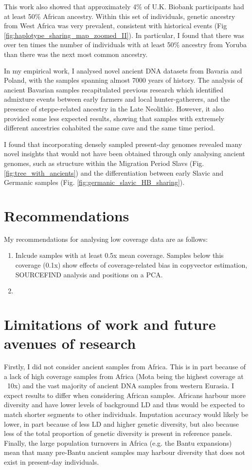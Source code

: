 This work also showed that approximately 4\% of U.K. Biobank participants had at least 50\% African ancestry. Within this set of individuals, genetic ancestry from West Africa was very prevalent, consistent with historical events (Fig \ref{fig:haplotype_sharing_map_zoomed_II}). In particular, I found that there was over ten times the number of individuals with at least 50\% ancestry from Yoruba than there was the next most common ancestry. 

In my empirical work, I analysed novel ancient DNA datasets from Bavaria and Poland, with the samples spanning almost 7000 years of history. The analysis of ancient Bavarian samples recapitulated previous research which identified admixture events between early farmers and local hunter-gatherers, and the presence of steppe-related ancestry in the Late Neolithic. However, it also provided some less expected results, showing that samples with extremely different ancestries cohabited the same cave and the same time period. 

I found that incorporating densely sampled present-day genomes revealed many novel insights that would not have been obtained through only analysing ancient genomes, such as structure within the Migration Period Slavs (Fig. \ref{fig:tree_with_ancients}) and the differentiation between early Slavic and Germanic samples (Fig. \ref{fig:germanic_slavic_HB_sharing}).

\section{Recommendations}

My recommendations for analysing low coverage data are as follows:

\begin{enumerate}
\item Inlcude samples with at least 0.5x mean coverage. Samples below this coverage (0.1x) show effects of coverage-related bias in copyvector estimation, SOURCEFIND analysis and positions on a PCA. 
\item 
\end{enumerate}

\section{Limitations of work and future avenues of research}


Firstly, I did not consider ancient samples from Africa. This is in part because of a lack of high coverage samples from Africa (Mota being the highest coverage at ~10x) and the vast majority of ancient DNA samples from western Eurasia. I expect results to differ when considering African samples. Africans harbour more diversity and have lower levels of background LD \cite{bosch2009decay} and thus would be expected to match shorter segments to other individuals. Imputation accuracy would likely be lower, in part because of less LD and higher genetic diversity, but also because less of the total proportion of genetic diversity is present in reference panels. Finally, the large population turnovers in Africa (e.g. the Bantu expansions) mean that many pre-Bantu ancient samples may harbour diversity that does not exist in present-day individuals. 

